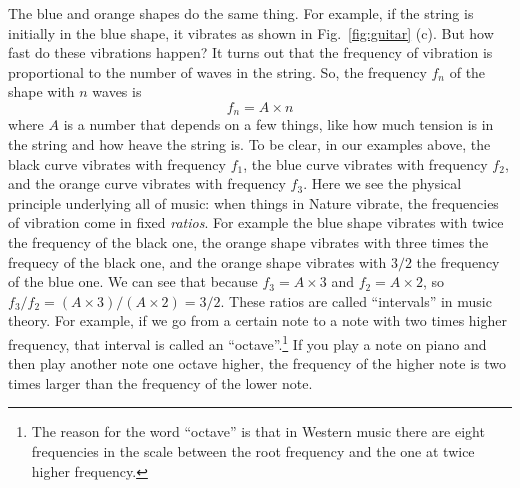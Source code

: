 \documentclass{article}
\begin{document}
The blue and orange shapes do the same thing.
For example, if the string is initially in the blue shape, it vibrates as shown in Fig.~\ref{fig:guitar} (c).
But how fast do these vibrations happen?
It turns out that the frequency of vibration is proportional to the number of waves in the string.
So, the frequency $f_n$ of the shape with $n$ waves is
\begin{equation}
  f_n = A \times n
\end{equation}
where $A$ is a number that depends on a few things, like how much tension is in the string and how heave the string is.
To be clear, in our examples above, the black curve vibrates with frequency $f_1$, the blue curve vibrates with frequency $f_2$, and the orange curve vibrates with frequency $f_3$.
Here we see the physical principle underlying all of music: when things in Nature vibrate, the frequencies of vibration come in fixed \emph{ratios}.
For example the blue shape vibrates with twice the frequency of the black one, the orange shape vibrates with three times the frequecy of the black one, and the orange shape vibrates with $3/2$ the frequency of the blue one.
We can see that because $f_3 = A \times 3$ and $f_2 = A \times 2$, so $f_3 / f_2 = (A \times 3) / (A \times 2) = 3/2$.
These ratios are called ``intervals'' in music theory.
For example, if we go from a certain note to a note with two times higher frequency, that interval is called an ``octave''.\footnote{The reason for the word ``octave'' is that in Western music there are eight frequencies in the scale between the root frequency and the one at twice higher frequency.}
If you play a note on piano and then play another note one octave higher, the frequency of the higher note is two times larger than the frequency of the lower note.


\end{document}
